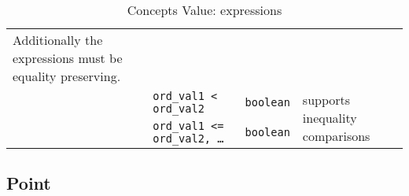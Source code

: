 \begin{table}[!htbp]
\begin{scriptsize}
\begin{tabular}{llll}
{      Additionally the expressions must be equality preserving.}                                                                                                                                          \\
      \multicolumn{1}{c|}{}                                 & \texttt{ord\_val1 < ord\_val2}         & \texttt{boolean}         & \multicolumn{1}{l}{\multirow{2}{*}{supports inequality comparisons}}    \\
      \multicolumn{1}{c|}{}                                 & \texttt{ord\_val1 <= ord\_val2, \dots} & \texttt{boolean}         & \multicolumn{1}{l}{}                                                    \\
      \cline{1-4}
    \end{tabular}
    \smallskip

    \caption{Concepts Value: expressions}
  \end{scriptsize}
  \label{concept.tables.value.expressions}
\end{table}


\subsection{Point}

